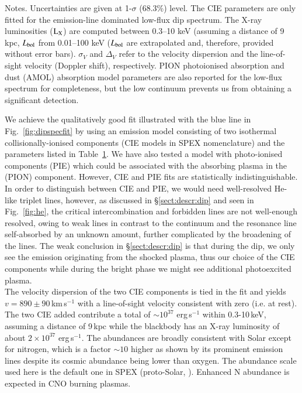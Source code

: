 \documentclass{aa}
\begin{document}
\begin{table*}
\begin{center}
\begin{tabular}{c | c | c | c c c}
\end{tabular}
\label{table:rgs_fit_colors}
\end{center}
Notes. Uncertainties are given at 1-$\sigma$ (68.3\%) level.
The {\scriptsize{CIE}} parameters are only fitted for the emission-line dominated low-flux dip spectrum. The X-ray luminosities (${\rm L}_{\rm X}$) are computed between
0.3--10 keV (assuming a distance of 9\,kpc, $L_{\rm bol}$
from 0.01--100 keV ($L_{\rm bol}$ are extrapolated and, therefore, provided without error bars). $\sigma_V$ and
$\Delta_V$ refer to the velocity dispersion and the line-of-sight velocity (Doppler shift), respectively. {\scriptsize{PION}}
photoionised absorption and dust (AMOL) absorption model parameters are also reported for the low-flux spectrum for completeness, but the low continuum prevents us from obtaining a significant detection.
\end{table*}

We achieve the qualitatively good fit illustrated with the blue line in Fig.~\ref{fig:dipspecfit}
by using an emission model consisting of two
isothermal collisionally-ionised components ({\scriptsize{CIE}} models in
SPEX nomenclature) and the parameters listed in Table~\ref{table:rgs_fit_colors}.
We have also tested a model with photo-ionised components ({\scriptsize{PIE}}) which could be
associated with the absorbing plasma in the ({\scriptsize{PION}}) component. However,
{\scriptsize{CIE}} and {\scriptsize{PIE}} fits are statistically indistinguishable.
In order to distinguish between {\scriptsize{CIE}} and {\scriptsize{PIE}},
we would need well-resolved He-like triplet lines, however, as discussed in
\S\ref{sect:descr:dip} and seen in Fig.~\ref{fig:he}, the critical intercombination
and forbidden lines are not well-enough resolved, owing to weak lines in contrast
to the continuum and the resonance line self-absorbed by an unknown amount,
further complicated by the broadening of the lines.
The weak conclusion in \S\ref{sect:descr:dip} is that during the
dip, we only see the emission originating from the shocked plasma, thus our choice
of the {\scriptsize{CIE}} components while during the bright phase we might see
additional photoexcited plasma.\\

The velocity dispersion of the two {\scriptsize{CIE}} components is tied in the
fit and yields $v=890\pm90$\,km\,s$^{-1}$ with a line-of-sight velocity consistent with zero
(i.e. at rest). The two {\scriptsize{CIE}} added contribute a total of
$\sim 10^{37}$ erg\,s$^{-1}$ within 0.3-10\,keV, assuming a distance of 9\,kpc
while the blackbody
has an X-ray luminosity of about $2\times10^{37}$ erg\,s$^{-1}$.
The abundances are broadly consistent with Solar except for nitrogen, which is a factor
$\sim10$ higher as shown by its prominent emission lines despite its cosmic abundance
being lower than oxygen. The abundance scale used here is the default one in
SPEX (proto-Solar, \citealt{Lodders2009}). Enhanced N abundance is expected
in CNO burning plasmas.\\
\end{document}
